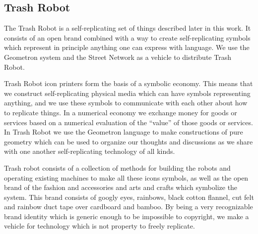 \subsection{Trash Robot}

The Trash Robot is a self-replicating set of things described later in this work.  It consists of an open brand combined with a way to create self-replicating symbols which represent in principle anything one can express with language.  We use the Geometron system and the Street Network as a vehicle to distribute Trash Robot.    

Trash Robot icon printers form the basis of a symbolic economy.  This means that we construct self-replicating physical media which can have symbols representing anything, and we use these symbols to communicate with each other about how to replicate things. In a numerical economy we exchange money for goods or services based on a numerical evaluation of the ``value'' of those goods or services.  In Trash Robot we use the Geometron language to make constructions of pure geometry which can be used to organize our thoughts and discussions as we share with one another self-replicating technology of all kinds.

Trash robot consists of a collection of methods for building the robots and operating existing machines to make all these icons symbols, as well as the open brand of the fashion and accessories and arts and crafts which symbolize the system.  This brand consists of googly eyes, rainbows, black cotton flannel, cut felt and rainbow duct tape over cardboard and bamboo.  By being a very recognizable brand identity which is generic enough to be impossible to copyright, we make a vehicle for technology which is not property to freely replicate.


